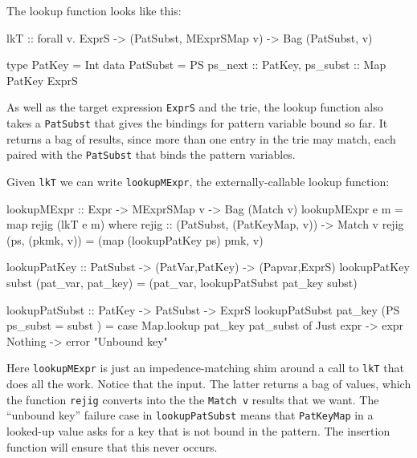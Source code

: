 \documentclass[acmsmall]{acmart}
\theoremstyle{theorem}
\theoremstyle{definition}
\theoremstyle{remark}
\begin{document}
The lookup function looks like this:
\begin{code}
lkT :: forall v. ExprS -> (PatSubst, MExprSMap v) -> Bag (PatSubst, v)

type PatKey = Int
data PatSubst = PS { ps_next  :: PatKey, ps_subst :: Map PatKey ExprS }
\end{code}
As well as the target expression \lstinline{ExprS} and the trie, the lookup function also takes
a \lstinline{PatSubst} that gives the bindings for pattern variable bound so far.
It returns a bag of results, since more than one entry in the trie may match,
each paired with the \lstinline{PatSubst} that binds the pattern variables.

Given \lstinline{lkT} we can write \lstinline{lookupMExpr},
the externally-callable lookup function:
\begin{code}
lookupMExpr :: Expr -> MExprSMap v -> Bag (Match v)
lookupMExpr e m = map rejig (lkT e m)
  where
    rejig :: (PatSubst, (PatKeyMap, v)) -> Match v
    rejig (ps, (pkmk, v)) = (map (lookupPatKey ps) pmk, v)

lookupPatKey :: PatSubst -> (PatVar,PatKey) -> (Papvar,ExprS)
lookupPatKey subst (pat_var, pat_key) = (pat_var, lookupPatSubst pat_key subst)

lookupPatSubst :: PatKey -> PatSubst -> ExprS
lookupPatSubst pat_key (PS { ps_subst = subst })
  = case Map.lookup pat_key pat_subst of
      Just expr -> expr
      Nothing   -> error "Unbound key"
\end{code}
Here \lstinline{lookupMExpr} is just an impedence-matching shim around
a call to \lstinline{lkT} that does all the work.  Notice that the
input.  The latter returns a bag of 
values, which the function \lstinline{rejig} converts into the
the \lstinline{Match v} results that we want.  The ``unbound key''
failure case in \lstinline{lookupPatSubst} means that
\lstinline{PatKeyMap} in a looked-up value asks for a key that is not
bound in the pattern.  The insertion function will ensure that this
never occurs.
\end{document}
